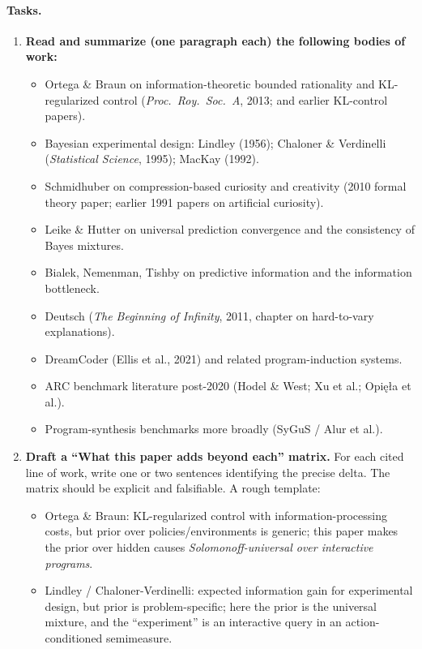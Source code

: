 \documentclass[11pt]{article}
\begin{document}
\paragraph{Tasks.}
\begin{enumerate}[leftmargin=*]
\item \textbf{Read and summarize (one paragraph each) the following bodies of work:}
\begin{itemize}[leftmargin=*]
\item Ortega \& Braun on information-theoretic bounded rationality and KL-regularized control (\emph{Proc.\ Roy.\ Soc.\ A}, 2013; and earlier KL-control papers).
\item Bayesian experimental design: Lindley (1956); Chaloner \& Verdinelli (\emph{Statistical Science}, 1995); MacKay (1992).
\item Schmidhuber on compression-based curiosity and creativity (2010 formal theory paper; earlier 1991 papers on artificial curiosity).
\item Leike \& Hutter on universal prediction convergence and the consistency of Bayes mixtures.
\item Bialek, Nemenman, Tishby on predictive information and the information bottleneck.
\item Deutsch (\emph{The Beginning of Infinity}, 2011, chapter on hard-to-vary explanations).
\item DreamCoder (Ellis et al., 2021) and related program-induction systems.
\item ARC benchmark literature post-2020 (Hodel \& West; Xu et al.; Opi\k{e}{\l}a et al.).
\item Program-synthesis benchmarks more broadly (SyGuS / Alur et al.).
\end{itemize}
\item \textbf{Draft a ``What this paper adds beyond each'' matrix.} For each cited line of work, write one or two sentences identifying the precise delta. The matrix should be explicit and falsifiable. A rough template:
\begin{itemize}[leftmargin=*]
\item Ortega \& Braun: KL-regularized control with information-processing costs, but prior over policies/environments is generic; this paper makes the prior over hidden causes \emph{Solomonoff-universal over interactive programs}.
\item Lindley / Chaloner-Verdinelli: expected information gain for experimental design, but prior is problem-specific; here the prior is the universal mixture, and the ``experiment'' is an interactive query in an action-conditioned semimeasure.

\end{itemize}
\end{enumerate}
\end{document}
